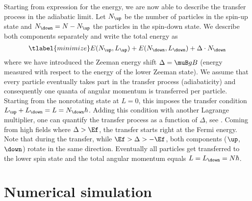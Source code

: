
Starting from expression  for the energy, we are now able to describe the transfer process in the adiabatic limit. Let $N_\up$ be the number of particles in the spin-up state and $N_\down = N-N_\up$ the particles in the spin-down state. We describe both components separately and write the total energy as
\begin{align} \tlabel{minimize}
E(N_\up,L_\up) + E(N_\down,L_\down) + \Delta\cdot N_\down
\end{align}
where we have introduced the Zeeman energy shift $\Delta=\muB g B$ (energy measured with respect to the energy of the lower Zeeman state). We assume that every particle eventually takes part in the transfer process (adiabaticity) and consequently one quanta of angular momentum is transferred per particle. Starting from the nonrotating state at $L=0$, this imposes the transfer condition $L_\up + L_\down = L = N_\down\hbar$. Adding this condition with another Lagrange multiplier, one can quantify the transfer process as a function of $\Delta$, see . Coming from high fields where $\Delta > \Ef$, the transfer starts right at the Fermi energy. Note that during the transfer, while $\Ef > \Delta > -\Ef$, both components ($\up$, $\down$) rotate in the same direction. Eventually all particles get transferred to the lower spin state and the total angular momentum equals $L=L_\down=N\hbar$.

\section{Numerical simulation}

